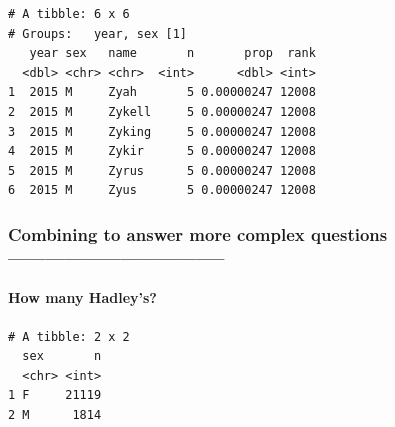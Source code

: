 \documentclass[]{book}
\newenvironment{Shaded}{\begin{snugshade}}{\end{snugshade}}
\newcommand{\DataTypeTok}[1]{\textcolor[rgb]{0.13,0.29,0.53}{#1}}
\newcommand{\KeywordTok}[1]{\textcolor[rgb]{0.13,0.29,0.53}{\textbf{#1}}}
\newcommand{\NormalTok}[1]{#1}
\newcommand{\OperatorTok}[1]{\textcolor[rgb]{0.81,0.36,0.00}{\textbf{#1}}}
\newcommand{\StringTok}[1]{\textcolor[rgb]{0.31,0.60,0.02}{#1}}
\let\oldparagraph\paragraph
\renewcommand{\paragraph}[1]{\oldparagraph{#1}\mbox{}}
\theoremstyle{definition}
\theoremstyle{definition}
\theoremstyle{definition}
\theoremstyle{remark}
\begin{document}
\begin{Shaded}
\end{Shaded}

\begin{verbatim}
# A tibble: 6 x 6
# Groups:   year, sex [1]
   year sex   name       n       prop  rank
  <dbl> <chr> <chr>  <int>      <dbl> <int>
1  2015 M     Zyah       5 0.00000247 12008
2  2015 M     Zykell     5 0.00000247 12008
3  2015 M     Zyking     5 0.00000247 12008
4  2015 M     Zykir      5 0.00000247 12008
5  2015 M     Zyrus      5 0.00000247 12008
6  2015 M     Zyus       5 0.00000247 12008
\end{verbatim}

\hypertarget{combining-to-answer-more-complex-questions}{%
\subsubsection{Combining to answer more complex questions
-----------------------------------}\label{combining-to-answer-more-complex-questions}}

\hypertarget{how-many-hadleys}{%
\paragraph{How many Hadley's?}\label{how-many-hadleys}}

\begin{Shaded}
\end{Shaded}

\begin{verbatim}
# A tibble: 2 x 2
  sex       n
  <chr> <int>
1 F     21119
2 M      1814
\end{verbatim}
\end{document}
